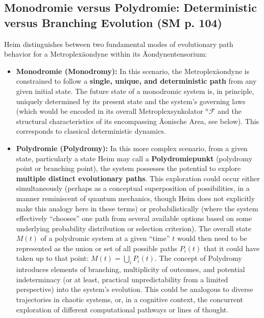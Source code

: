 \documentclass[
    12pt,              %
    a4paper,           %
    headings=normal,   %
    twoside=true,      %
    BCOR=8mm,          %
]{scrbook}
\newcommand{\q}[1]{\enquote{#1}}
\newcommand{\metroplexsynkolator}[1]{{}^{#1}\mathcal{F}}
\newcommand{\metroplexaeondyne}{\text{Metroplexäondyne}}
\begin{document}
\subsection{Monodromie versus Polydromie: Deterministic versus Branching Evolution (SM p. 104)}
\label{sec:ch6_monodromie_polydromie}
Heim distinguishes between two fundamental modes of evolutionary path behavior for a \(\metroplexaeondyne\) within its Äondynentensorium:
\begin{itemize}
    \item   \textbf{Monodromie (Monodromy):} In this scenario, the \(\metroplexaeondyne\) is constrained to follow a \textbf{single, unique, and deterministic path} from any given initial state. The future state of a monodromic system is, in principle, uniquely determined by its present state and the system’s governing laws (which would be encoded in its overall Metroplexsynkolator \(\metroplexsynkolator{n}\) and the structural characteristics of its encompassing Äonische Area, see below). This corresponds to classical deterministic dynamics.
    \item   \textbf{Polydromie (Polydromy):} In this more complex scenario, from a given state, particularly a state Heim may call a \textbf{Polydromiepunkt} (polydromy point or branching point), the system possesses the potential to explore \textbf{multiple distinct evolutionary paths}. This exploration could occur either simultaneously (perhaps as a conceptual superposition of possibilities, in a manner reminiscent of quantum mechanics, though Heim does not explicitly make this analogy here in these terms) or probabilistically (where the system effectively \q{chooses} one path from several available options based on some underlying probability distribution or selection criterion). The overall state \(M(t)\) of a polydromic system at a given \q{time} \(t\) would then need to be represented as the union or set of all possible paths \(P_i(t)\) that it could have taken up to that point: \(M(t) = \bigcup_i P_i(t)\). The concept of Polydromy introduces elements of branching, multiplicity of outcomes, and potential indeterminacy (or at least, practical unpredictability from a limited perspective) into the system’s evolution. This could be analogous to diverse trajectories in chaotic systems, or, in a cognitive context, the concurrent exploration of different computational pathways or lines of thought.
\end{itemize}
\end{document}

